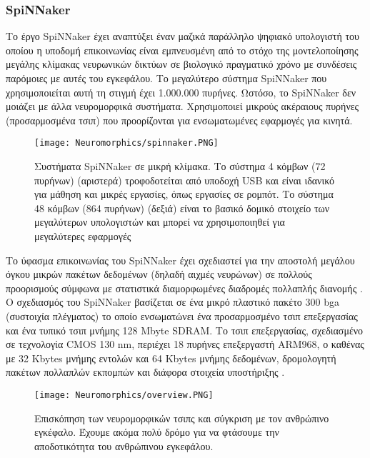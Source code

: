 \documentclass[12pt]{report}
\begin{document}
\subsubsection{\textlatin{SpiNNaker}}
Το έργο \textlatin{SpiNNaker} \cite{furber2014} έχει αναπτύξει έναν μαζικά παράλληλο ψηφιακό υπολογιστή του οποίου η υποδομή επικοινωνίας είναι εμπνευσμένη από το στόχο της μοντελοποίησης μεγάλης κλίμακας νευρωνικών δικτύων σε βιολογικό πραγματικό χρόνο με συνδέσεις παρόμοιες με αυτές του εγκεφάλου. Το μεγαλύτερο σύστημα \textlatin{SpiNNaker} που χρησιμοποιείται αυτή τη στιγμή έχει 1.000.000 πυρήνες. Ωστόσο, το \textlatin{SpiNNaker} δεν μοιάζει με άλλα νευρομορφικά συστήματα. Χρησιμοποιεί μικρούς ακέραιους πυρήνες (προσαρμοσμένα τσιπ) που προορίζονται για ενσωματωμένες εφαρμογές για κινητά. 
\begin{figure}[htp]
    \centering
    \texttt{[image: Neuromorphics/spinnaker.PNG]}
    \caption{Συστήματα \textlatin{SpiNNaker} σε μικρή κλίμακα. Το σύστημα 4 κόμβων (72 πυρήνων) (αριστερά) τροφοδοτείται από υποδοχή USB και είναι ιδανικό για μάθηση και μικρές εργασίες, όπως εργασίες σε ρομπότ. Το σύστημα 48 κόμβων (864 πυρήνων) (δεξιά) είναι το βασικό δομικό στοιχείο των μεγαλύτερων υπολογιστών και μπορεί να χρησιμοποιηθεί για μεγαλύτερες εφαρμογές}
    \label{fig:spinnaker}
\end{figure}

Το ύφασμα επικοινωνίας του \textlatin{SpiNNaker} έχει σχεδιαστεί για την αποστολή μεγάλου όγκου μικρών πακέτων δεδομένων (δηλαδή αιχμές νευρώνων) σε πολλούς προορισμούς σύμφωνα με στατιστικά διαμορφωμένες διαδρομές πολλαπλής διανομής \cite{plana2011}.
Ο σχεδιασμός του \textlatin{SpiNNaker} βασίζεται σε ένα μικρό πλαστικό πακέτο 300 \textlatin{bga} (συστοιχία πλέγματος) το οποίο ενσωματώνει ένα προσαρμοσμένο τσιπ επεξεργασίας και ένα τυπικό τσιπ μνήμης 128 \textlatin{Mbyte SDRAM}. Το τσιπ επεξεργασίας, σχεδιασμένο σε τεχνολογία \textlatin{CMOS 130 nm}, περιέχει 18 πυρήνες επεξεργαστή \textlatin{ARM968}, ο καθένας με 32 \textlatin{Kbytes} μνήμης εντολών και 64 \textlatin{Kbytes} μνήμης δεδομένων, δρομολογητή πακέτων πολλαπλών εκπομπών και διάφορα στοιχεία υποστήριξης \cite{painkras2013} \cite{furber2016 }.

\begin{figure}[htp]
    \centering
    \texttt{[image: Neuromorphics/overview.PNG]}
    \caption{Επισκόπηση των νευρομορφικών τσιπς και σύγκριση με τον ανθρώπινο εγκέφαλο. Έχουμε ακόμα πολύ δρόμο για να φτάσουμε την αποδοτικότητα του ανθρώπινου εγκεφάλου.}
    \label{fig:overview}
\end{figure}
\end{document}
